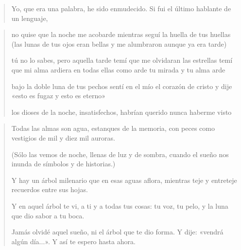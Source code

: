 \documentclass[a4paper, 12pt]{article}
\begin{document}
\pagebreak 

\begin{verse}
    Yo, que era una palabra, he sido enmudecido. 
    Si fui el último hablante de un lenguaje,
\end{verse}

\pagebreak 

\begin{verse}


no quise que la noche me acobarde
mientras seguí la huella de tus huellas
(las lunas de tus ojos eran bellas
y me alumbraron aunque ya era tarde)

tú no lo sabes, pero aquella tarde 
temí que me olvidaran las estrellas
temí que mi alma ardiera en todas ellas
como arde tu mirada y tu alma arde

bajo la doble luna de tus pechos
sentí en el mío el corazón de cristo
y dije «esto es fugaz y esto es eterno» 

los dioses de la noche, insatisfechos,
habrían querido nunca haberme visto 
















\end{verse}

\pagebreak

\begin{verse}

Todas las almas son agua,
estanques de la memoria,
con peces como vestigios
de mil y diez mil auroras.

(Sólo las vemos de noche,
llenas de luz y de sombra,
cuando el sueño nos inunda
de símbolos y de historias.)

Y hay un árbol milenario
que en esas aguas aflora,
mientras teje y entreteje 
recuerdos entre sus hojas.

Y en aquel árbol te vi,
a ti y a todas tus cosas:
tu voz, tu pelo, y la luna
que dio sabor a tu boca.

Jamás olvidé aquel sueño,
ni el árbol que te dio forma.
Y dije: «vendrá algún día...».
Y así te espero hasta ahora.













\end{verse}
\end{document}
